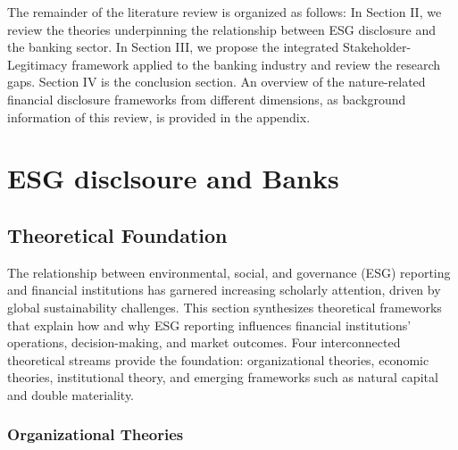\documentclass[
  authoryear]{elsarticle}
\begin{document}
The remainder of the literature review is organized as follows: In
Section II, we review the theories underpinning the relationship between
ESG disclosure and the banking sector. In Section III, we propose the
integrated Stakeholder-Legitimacy framework applied to the banking
industry and review the research gaps. Section IV is the conclusion
section. An overview of the nature-related financial disclosure
frameworks from different dimensions, as background information of this
review, is provided in the appendix.

\section{ESG disclsoure and Banks}\label{esg-disclsoure-and-banks}

\subsection{Theoretical Foundation}\label{theoretical-foundation}

The relationship between environmental, social, and governance (ESG)
reporting and financial institutions has garnered increasing scholarly
attention, driven by global sustainability challenges. This section
synthesizes theoretical frameworks that explain how and why ESG
reporting influences financial institutions' operations,
decision-making, and market outcomes. Four interconnected theoretical
streams provide the foundation: organizational theories, economic
theories, institutional theory, and emerging frameworks such as natural
capital and double materiality.

\subsubsection{Organizational Theories}\label{organizational-theories}
\end{document}

